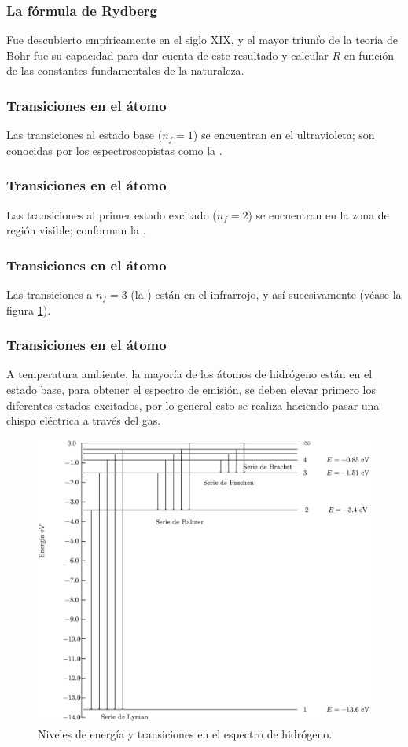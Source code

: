 \documentclass[12pt]{beamer}
\begin{document}
\begin{frame}
\frametitle{La fórmula de Rydberg}
Fue descubierto empíricamente en el siglo XIX, y el mayor triunfo de la teoría de Bohr fue su capacidad para dar cuenta de este resultado y calcular $R$ en función de las constantes fundamentales de la naturaleza.
\end{frame}
\begin{frame}
\frametitle{Transiciones en el átomo}
Las transiciones al estado base ($n_{f}= 1$) se encuentran en el ultravioleta; \pause son conocidas por los espectroscopistas como la .
\end{frame}
\begin{frame}
\frametitle{Transiciones en el átomo}
Las transiciones al primer estado excitado ($n_{f}= 2$) se encuentran en la zona de región visible; conforman la .
\end{frame}
\begin{frame}
\frametitle{Transiciones en el átomo}
Las transiciones a $n_{f} = 3$ (la ) están en el infrarrojo, y así sucesivamente (véase la figura \ref{fig:figura_espectro_H}).
\end{frame}
\begin{frame}
\frametitle{Transiciones en el átomo}
A temperatura ambiente, la mayoría de los átomos de hidrógeno están en el estado base, para obtener el espectro de emisión, se deben elevar primero los diferentes estados excitados, por lo general esto se realiza haciendo pasar una chispa eléctrica a través del gas.
\end{frame}
\begin{frame}[plain]
\begin{figure}[H]
    \centering
    \includegraphics[scale=0.5]{Imagenes/espectrohidrogeno.eps}
    \caption{Niveles de energía y transiciones en el espectro de hidrógeno.}
    \label{fig:figura_espectro_H}
\end{figure}
\end{frame}
\end{document}
